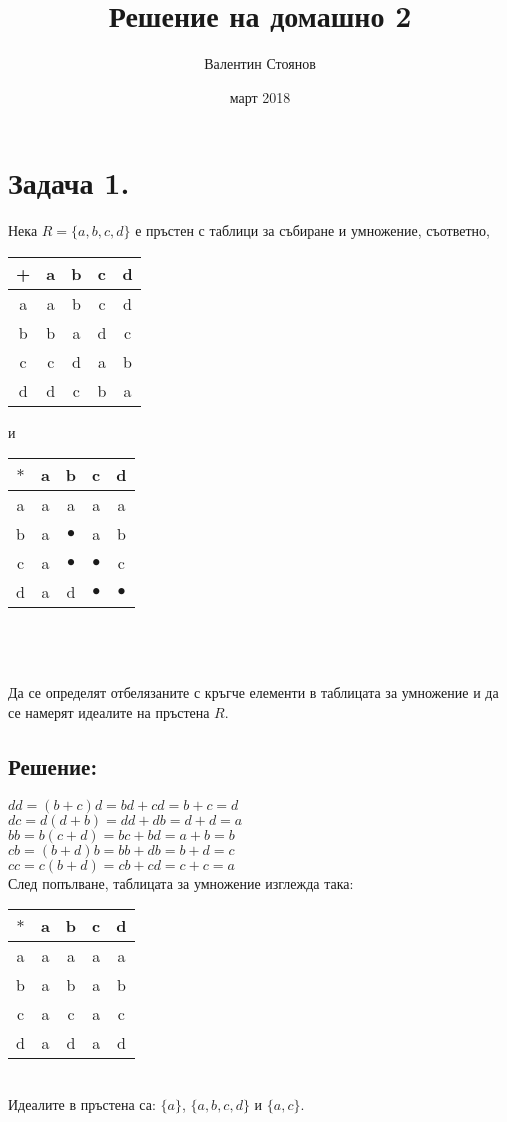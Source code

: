 \documentclass[10pt]{article}
\begin{document}
\title{Решение на домашно 2}
\author{Валентин Стоянов}
\date{март 2018}
\maketitle

\section*{Задача 1.}
Нека $R = \{a, b, c, d\}$ е пръстен с таблици за събиране и умножение, съответно,\\

\begin{tabular}{ |c|c|c|c|c| } 
	\hline
	+ & a & b & c & d \\ 
	\hline
	a & a & b & c & d \\
	\hline
	b & b & a & d & c \\
	\hline
	c & c & d & a & b \\
	\hline
	d & d & c & b & a\\
	\hline
\end{tabular}
\quad
и
\quad
\begin{tabular}{ |c|c|c|c|c| } 
	\hline
	$\ast$ & a & b & c & d \\ 
	\hline
	a & a & a & a & a \\
	\hline
	b & a & $\bullet$ & a & b \\
	\hline
	c & a & $\bullet$ & $\bullet$ & c \\
	\hline
	d & a & d & $\bullet$ & $\bullet$ \\
	\hline
\end{tabular}
\\
\\
\\
Да се определят отбелязаните с кръгче елементи в таблицата за умножение и да се намерят идеалите на пръстена $R$.
\subsection*{Решение:}
$dd = (b + c)d = bd + cd = b + c = d$\\
$dc = d(d + b) = dd + db = d + d = a$\\
$bb = b(c + d) = bc + bd = a + b = b$\\
$cb = (b + d)b = bb + db = b + d = c$\\
$cc = c(b + d) = cb + cd = c + c = a$\\
След попълване, таблицата за умножение изглежда така: \quad
\begin{tabular}{ |c|c|c|c|c| } 
	\hline
	$\ast$ & a & b & c & d \\ 
	\hline
	a & a & a & a & a \\
	\hline
	b & a & b & a & b \\
	\hline
	c & a & c & a & c \\
	\hline
	d & a & d & a & d \\
	\hline
\end{tabular}
\\
Идеалите в пръстена са: $\{a\}$, $\{a, b, c, d\}$ и $\{a, c\}$.\\
\newpage
\end{document}

